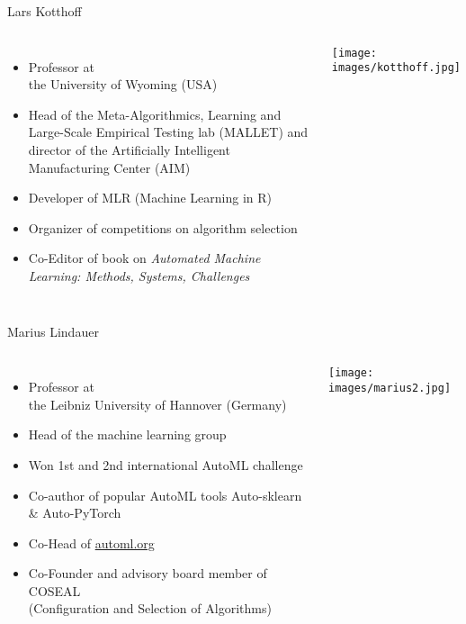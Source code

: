 \begin{frame}[c]{Lars Kotthoff}

\begin{columns}


	\begin{itemize}
		\item Professor at\\ the University of Wyoming (USA)
        \item Head of the Meta-Algorithmics, Learning and Large-Scale Empirical Testing lab
            (MALLET) and director of the Artificially Intelligent Manufacturing
            Center (AIM)
		\item Developer of MLR (Machine Learning in R)
		\item Organizer of competitions on algorithm selection
    	\item Co-Editor of book on \textit{Automated Machine Learning:	Methods, Systems, Challenges}
	\end{itemize}


	\texttt{[image: images/kotthoff.jpg]}

\end{columns}

\end{frame}
\begin{frame}[c]{Marius Lindauer}

\begin{columns}


	\begin{itemize}
		\item Professor at\\ the Leibniz University of Hannover (Germany)
		\item Head of the machine learning group
		\item Won 1st and 2nd international AutoML challenge
		\item Co-author of popular AutoML tools Auto-sklearn \& Auto-PyTorch
		\item Co-Head of \url{automl.org}
		\item Co-Founder and advisory board member of COSEAL\\ (Configuration and Selection of Algorithms)
	\end{itemize}


	\texttt{[image: images/marius2.jpg]}

\end{columns}

\end{frame}
